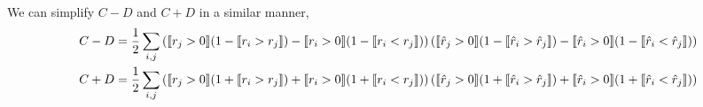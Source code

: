 We can simplify $C-D$ and $C+D$ in a similar manner,
\begin{align*}
C-D &= \frac{1}{2} \sum_{i,j} \left( \llbracket r_j > 0 \rrbracket (1 - \llbracket r_i > r_j \rrbracket) - \llbracket r_i > 0 \rrbracket (1 - \llbracket r_i < r_j \rrbracket) \right)
       \left( \llbracket \hat{r}_j > 0 \rrbracket (1 - \llbracket \hat{r}_i > \hat{r}_j \rrbracket) - \llbracket \hat{r}_i > 0 \rrbracket (1 - \llbracket \hat{r}_i < \hat{r}_j \rrbracket) \right) \\
C+D &= \frac{1}{2} \sum_{i,j} \left( \llbracket r_j > 0 \rrbracket (1 + \llbracket r_i > r_j \rrbracket) + \llbracket r_i > 0 \rrbracket (1 + \llbracket r_i < r_j \rrbracket) \right)
       \left( \llbracket \hat{r}_j > 0 \rrbracket (1 + \llbracket \hat{r}_i > \hat{r}_j \rrbracket) + \llbracket \hat{r}_i > 0 \rrbracket (1 + \llbracket \hat{r}_i < \hat{r}_j \rrbracket) \right)
\end{align*}

